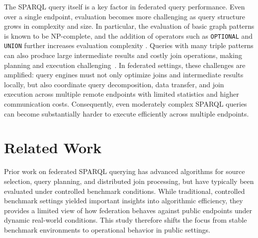 \documentclass[runningheads]{llncs}
\begin{document}
The SPARQL query itself is a key factor in federated query performance. 
Even over a single endpoint, evaluation becomes more challenging as query structure grows in complexity and size.
In particular, the evaluation of basic graph patterns is known to be NP-complete, and the addition of operators such as \texttt{OPTIONAL} and \texttt{UNION} further increases evaluation complexity \cite{Perez2009Semantics}. 
Queries with many triple patterns can also produce large intermediate results and costly join operations, making planning and execution challenging~\cite{Schmidt2010Foundations}. 
In federated settings, these challenges are amplified: query engines must not only optimize joins and intermediate results locally, but also coordinate query decomposition, data transfer, and join execution across multiple remote endpoints with limited statistics and higher communication costs. 
Consequently, even moderately complex SPARQL queries can become substantially harder to execute efficiently across multiple endpoints.


\section{Related Work}\label{sec3}
Prior work on federated SPARQL querying has advanced algorithms for source selection, query planning, and distributed join processing, but have typically been evaluated under controlled benchmark conditions. 
While traditional, controlled benchmark settings yielded important insights into algorithmic efficiency, they provides a limited view of how federation behaves against public endpoints under dynamic real-world conditions. 
This study therefore shifts the focus from stable benchmark environments to operational behavior in public settings.
\end{document}
